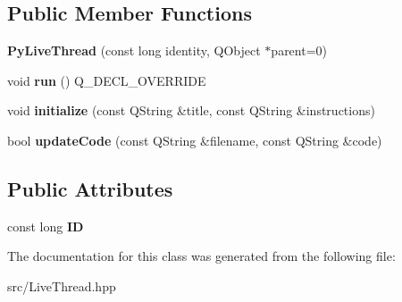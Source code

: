 \subsection*{Public Member Functions}
\begin{DoxyCompactItemize}
\item 
\hypertarget{classPyLiveThread_a1a20ad7d1594c37d9651e2971f5df803}{{\bfseries Py\+Live\+Thread} (const long identity, Q\+Object $\ast$parent=0)}\label{classPyLiveThread_a1a20ad7d1594c37d9651e2971f5df803}

\item 
\hypertarget{classPyLiveThread_a03bd9e5eba5ede6530221307e432bef1}{void {\bfseries run} () Q\+\_\+\+D\+E\+C\+L\+\_\+\+O\+V\+E\+R\+R\+I\+D\+E}\label{classPyLiveThread_a03bd9e5eba5ede6530221307e432bef1}

\item 
\hypertarget{classPyLiveThread_ad4f6dcdcab25b029c311bed78fa5fd92}{void {\bfseries initialize} (const Q\+String \&title, const Q\+String \&instructions)}\label{classPyLiveThread_ad4f6dcdcab25b029c311bed78fa5fd92}

\item 
\hypertarget{classPyLiveThread_a212b2b893d60e2ff898d1b0661987eef}{bool {\bfseries update\+Code} (const Q\+String \&filename, const Q\+String \&code)}\label{classPyLiveThread_a212b2b893d60e2ff898d1b0661987eef}

\end{DoxyCompactItemize}
\subsection*{Public Attributes}
\begin{DoxyCompactItemize}
\item 
\hypertarget{classLiveThread_a5cfdefd7574fb1f34bbe1d21b5e3c1d8}{const long {\bfseries I\+D}}\label{classLiveThread_a5cfdefd7574fb1f34bbe1d21b5e3c1d8}

\end{DoxyCompactItemize}


The documentation for this class was generated from the following file\+:\begin{DoxyCompactItemize}
\item 
src/Live\+Thread.\+hpp\end{DoxyCompactItemize}

